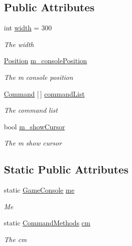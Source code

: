 \subsection*{Public Attributes}
\begin{DoxyCompactItemize}
\item 
int \hyperlink{class_lerp2_a_p_i_1_1_game_1_1_game_console_aeb707b7f970042ffeb28ae650deb5947}{width} = 300
\begin{DoxyCompactList}\small\item\em The width \end{DoxyCompactList}\item 
\hyperlink{namespace_lerp2_a_p_i_a5b0f263f740f1f4c8b67cf0c011dd90d}{Position} \hyperlink{class_lerp2_a_p_i_1_1_game_1_1_game_console_adb8a5904b26ad317c05286e36ddbc0cd}{m\+\_\+console\+Position}
\begin{DoxyCompactList}\small\item\em The m console position \end{DoxyCompactList}\item 
\hyperlink{class_lerp2_a_p_i_1_1_game_1_1_command}{Command} \mbox{[}$\,$\mbox{]} \hyperlink{class_lerp2_a_p_i_1_1_game_1_1_game_console_a53a21ed9b0ec7656aec18321a3d48d8a}{command\+List}
\begin{DoxyCompactList}\small\item\em The command list \end{DoxyCompactList}\item 
bool \hyperlink{class_lerp2_a_p_i_1_1_game_1_1_game_console_a6a564e5b24e94a40789c842b6369b103}{m\+\_\+show\+Cursor}
\begin{DoxyCompactList}\small\item\em The m show cursor \end{DoxyCompactList}\end{DoxyCompactItemize}
\subsection*{Static Public Attributes}
\begin{DoxyCompactItemize}
\item 
static \hyperlink{class_lerp2_a_p_i_1_1_game_1_1_game_console}{Game\+Console} \hyperlink{class_lerp2_a_p_i_1_1_game_1_1_game_console_a9182dad70d48386914d0aa424eee2cdf}{me}
\begin{DoxyCompactList}\small\item\em Me \end{DoxyCompactList}\item 
static \hyperlink{class_command_methods}{Command\+Methods} \hyperlink{class_lerp2_a_p_i_1_1_game_1_1_game_console_ad986d8fae40bb96cd778d1608f090ea6}{cm}
\begin{DoxyCompactList}\small\item\em The cm \end{DoxyCompactList}\end{DoxyCompactItemize}
